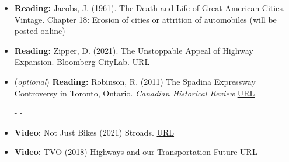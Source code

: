 \documentclass[11pt]{article}
\begin{document}
	\begin{itemize}
		
		\item \textbf{Reading:} Jacobs, J. (1961). The Death and Life of Great American Cities. Vintage.
		Chapter 18: Erosion of cities or attrition of automobiles (will be posted online)
					
		
		\item \textbf{Reading:} Zipper, D. (2021). The Unstoppable Appeal of Highway Expansion. Bloomberg CityLab. \href{https://www.bloomberg.com/news/features/2021-09-28/why-widening-highways-doesn-t-bring-traffic-relief}{URL}
		
		\item (\textit{optional}) \textbf{Reading:} Robinson, R. (2011) The Spadina Expressway Controversy in Toronto, Ontario. \textit{ Canadian Historical Review} \href{https://www.utpjournals.press/doi/pdf/10.3138/chr.92.2.295}{URL}
		
		- -
		
		\item \textbf{Video:} Not Just Bikes (2021) Stroads. \href{https://www.youtube.com/watch?v=ORzNZUeUHAM}{URL}
		
		\item \textbf{Video:} TVO (2018) 
		Highways and our Transportation Future \href{https://www.tvo.org/video/highways-and-our-transportation-future}{URL}
		
		
	\end{itemize}




	
	
\end{document}
